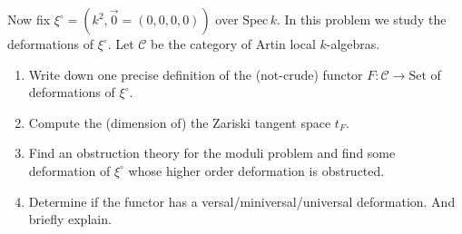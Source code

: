 Now fix $\xi^\circ=(k^2,\vec{0}=(0,0,0,0))$ over $\mathrm{Spec}\,k$.
In this problem we study the deformations of $\xi^\circ$. Let $\mathcal{C}$ be the category of Artin local $k$-algebras.
\begin{enumerate}[label=\arabic*.]
\item Write down one precise definition of the (not-crude) functor $F:\mathcal{C}\to \mathrm{Set}$ of deformations of $\xi^\circ$.
\item Compute the (dimension of) the Zariski tangent space $t_F$.
\item Find an obstruction theory for the moduli problem and find some deformation of $\xi^\circ$ whose higher order deformation is obstructed.
\item Determine if the functor has a versal/miniversal/universal deformation. And briefly explain.
\end{enumerate}


